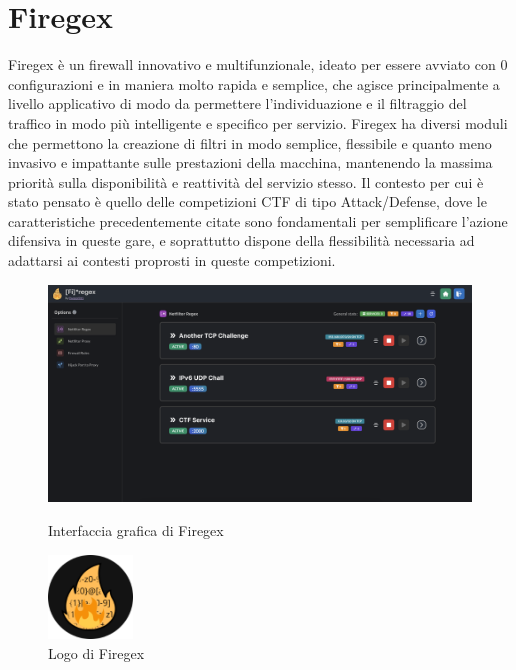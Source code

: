 \chapter{Firegex}

Firegex è un firewall innovativo e multifunzionale, ideato per essere avviato con 0 configurazioni e in maniera molto rapida e semplice, che agisce principalmente a
livello applicativo di modo da permettere l'individuazione e il filtraggio del traffico in modo più intelligente e specifico per servizio.
Firegex ha diversi moduli che permettono la creazione di filtri in modo semplice, flessibile e quanto meno invasivo e impattante sulle prestazioni della macchina,
mantenendo la massima priorità sulla disponibilità e reattività del servizio stesso.
Il contesto per cui è stato pensato è quello delle competizioni CTF di tipo Attack/Defense, dove le caratteristiche precedentemente citate sono fondamentali
per semplificare l'azione difensiva in queste gare, e soprattutto dispone della flessibilità necessaria ad adattarsi ai contesti proprosti in queste competizioni.
\begin{figure}[H]
    \centering
    \begin{minipage}[b]{0.7\textwidth}
        \centering
        \includegraphics[width=1\textwidth]{images/chapter2/Firegex_Screenshot.png}
        \caption{Interfaccia grafica di Firegex}
        \label{fig:firegex_frontend}
    \end{minipage}
    \begin{minipage}[b]{0.7\textwidth}
        \centering
        \includegraphics[width=0.20\textwidth]{images/chapter2/FiregexLogo.png}
        \caption{Logo di Firegex}
        \label{fig:firegex_logo}
    \end{minipage}
\end{figure}



